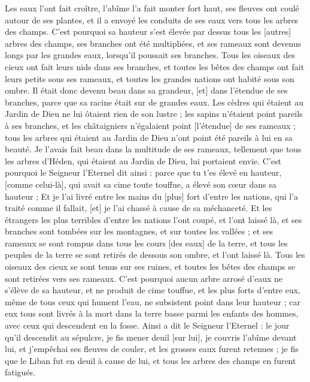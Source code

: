 \begin{multicols}{2}
Les eaux l'ont fait croître, l'abîme l'a fait monter fort haut, ses fleuves ont coulé autour de ses plantes, et il a envoyé les conduits de ses eaux vers tous les arbres des champs.
C'est pourquoi sa hauteur s'est élevée par dessus tous les [autres] arbres des champs, ses branches ont été multipliées, et ses rameaux sont devenus longs par les grandes eaux, lorsqu'il poussait ses branches.
Tous les oiseaux des cieux ont fait leurs nids dans ses branches, et toutes les bêtes des champs ont fait leurs petits sous ses rameaux, et toutes les grandes nations ont habité sous son ombre.
Il était donc devenu beau dans sa grandeur, [et] dans l'étendue de ses branches, parce que sa racine était sur de grandes eaux.
Les cèdres qui étaient au Jardin de Dieu ne lui ôtaient rien de son lustre ; les sapins n'étaient point pareils à ses branches, et les châtaigniers n'égalaient point [l'étendue] de ses rameaux ; tous les arbres qui étaient au Jardin de Dieu n'ont point été pareils à lui en sa beauté.
Je l'avais fait beau dans la multitude de ses rameaux, tellement que tous les arbres d'Héden, qui étaient au Jardin de Dieu, lui portaient envie.
C'est pourquoi le Seigneur l'Eternel dit ainsi : parce que tu t'es élevé en hauteur, [comme celui-là], qui avait sa cime toute touffue, a élevé son cœur dans sa hauteur ;
Et je l'ai livré entre les mains du [plus] fort d'entre les nations, qui l'a traité comme il fallait, [et] je l'ai chassé à cause de sa méchanceté.
Et les étrangers les plus terribles d'entre les nations l'ont coupé, et l'ont laissé là, et ses branches sont tombées sur les montagnes, et sur toutes les vallées ; et ses rameaux se sont rompus dans tous les cours [des eaux] de la terre, et tous les peuples de la terre se sont retirés de dessous son ombre, et l'ont laissé là.
Tous les oiseaux des cieux se sont tenus sur ses ruines, et toutes les bêtes des champs se sont retirées vers ses rameaux.
C'est pourquoi aucun arbre arrosé d'eaux ne s'élève de sa hauteur, et ne produit de cime touffue, et les plus forts d'entre eux, même de tous ceux qui hument l'eau, ne subsistent point dans leur hauteur ; car eux tous sont livrés à la mort dans la terre basse parmi les enfants des hommes, avec ceux qui descendent en la fosse.
Ainsi a dit le Seigneur l'Eternel : le jour qu'il descendit au sépulcre, je fis mener deuil [sur lui], je couvris l'abîme devant lui, et j'empêchai ses fleuves de couler, et les grosses eaux furent retenues ; je fis que le Liban fut en deuil à cause de lui, et tous les arbres des champs en furent fatigués.

\end{multicols}
